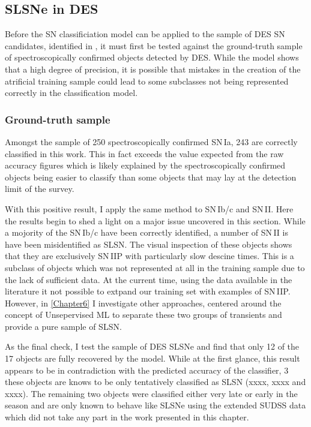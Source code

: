 \subsection{SLSNe in DES}
Before the SN classificiation model can be applied to the sample of DES SN candidates, identified in , it must first be tested against the ground-truth sample of spectroscopically confirmed objects detected by DES. While the model shows that a high degree of precision, it is possible that mistakes in the creation of the atrificial training sample could lead to some subclasses not being represented correctly in the classification model.

\subsubsection{Ground-truth sample} \label{sec:SNTruth}
Amongst the sample of 250 spectroscopically confirmed SN\,Ia, 243 are correctly classified in this work. This in fact exceeds the value expected from the raw accuracy figures which is likely explained by the spectroscopically confirmed objects being easier to classify than some objects that may lay at the detection limit of the survey.

With this positive result, I apply the same method to SN\,Ib/c and SN\,II. Here the results begin to shed a light on a major issue uncovered in this section. While a mojority of the SN\,Ib/c have been correctly identified, a number of SN\,II is have been misidentified as SLSN. The visual inspection of these objects shows that they are exclusively SN\,IIP with particularly slow descine times. This is a subclass of objects which was not represented at all in the training sample due to the lack of sufficient data. At the current time, using the data available in the literature it not possible to extpand our training set with examples of SN\,IIP. However, in \cref{Chapter6} I investigate other approaches, centered around the concept of Unsepervised ML to separate these two groups of transients and provide a pure sample of SLSN.

As the final check, I test the sample of DES SLSNe and find that only 12 of the 17 objects are fully recovered by the model. While at the first glance, this result appears to be in contradiction with the predicted accuracy of the classifier, 3 these objects are knows to be only tentatively classified as SLSN (xxxx, xxxx and xxxx). The remaining two objects were classified either very late or early in the season and are only known to behave like SLSNe using the extended SUDSS data which did not take any part in the work presented in this chapter.


